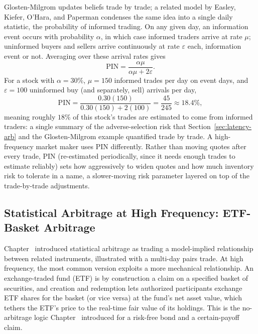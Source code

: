 \documentclass[../ai_in_finance]{subfiles}
\begin{document}
Glosten-Milgrom updates beliefs trade by trade; a related model by Easley, Kiefer, O'Hara, and Paperman condenses the same idea into a single daily statistic, the probability of informed trading. On any given day, an information event occurs with probability $\alpha$, in which case informed traders arrive at rate $\mu$; uninformed buyers and sellers arrive continuously at rate $\varepsilon$ each, information event or not. Averaging over these arrival rates gives
\begin{equation}
\text{PIN} = \frac{\alpha\mu}{\alpha\mu + 2\varepsilon}.
\label{eq:hft-pin}
\end{equation}
For a stock with $\alpha=30\%$, $\mu=150$ informed trades per day on event days, and $\varepsilon=100$ uninformed buy (and separately, sell) arrivals per day,
\begin{equation*}
\text{PIN} = \frac{0.30(150)}{0.30(150) + 2(100)} = \frac{45}{245} \approx 18.4\%,
\end{equation*}
meaning roughly $18\%$ of this stock's trades are estimated to come from informed traders: a single summary of the adverse-selection risk that Section~\ref{sec:latency-arb} and the Glosten-Milgrom example quantified trade by trade. A high-frequency market maker uses PIN differently. Rather than moving quotes after every trade, PIN (re-estimated periodically, since it needs enough trades to estimate reliably) sets how aggressively to widen quotes and how much inventory risk to tolerate in a name, a slower-moving risk parameter layered on top of the trade-by-trade adjustments.

\subsection{Statistical Arbitrage at High Frequency: ETF-Basket Arbitrage}

Chapter~ introduced statistical arbitrage as trading a model-implied relationship between related instruments, illustrated with a multi-day pairs trade. At high frequency, the most common version exploits a more mechanical relationship. An exchange-traded fund (ETF) is by construction a claim on a specified basket of securities, and creation and redemption lets authorized participants exchange ETF shares for the basket (or vice versa) at the fund's net asset value, which tethers the ETF's price to the real-time fair value of its holdings. This is the no-arbitrage logic Chapter~ introduced for a risk-free bond and a certain-payoff claim.
\end{document}
